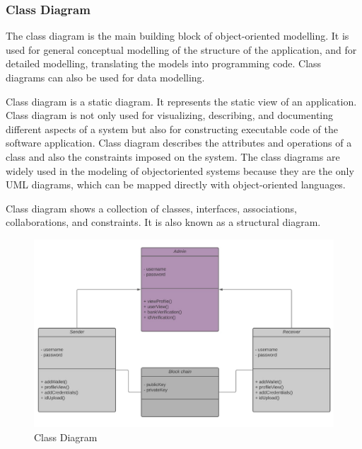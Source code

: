 \documentclass[12pt]{article}
\begin{document}
\newpage

\subsubsection{Class Diagram}

The class diagram is the main building block of object-oriented modelling. It is used for general conceptual modelling of the structure of the application, and for detailed modelling, translating the models into programming code. Class diagrams can also be used for data modelling.
\par Class diagram is a static diagram. It represents the static view of an application. Class diagram is not only used for visualizing, describing, and documenting different aspects of a system but also for constructing executable code of the software application. Class diagram describes the attributes and operations of a class and also the constraints imposed on the system. The class diagrams are widely used in the modeling of objectoriented systems because they are the only UML diagrams, which can be mapped directly with object-oriented languages.
\par Class diagram shows a collection of classes, interfaces, associations, collaborations, and constraints. It is also known as a structural diagram.

\begin{figure}[h!]
\begin{center}
\includegraphics[scale=.9]{CLS}
\caption{Class Diagram}
\end{center}
\end{figure}
\newpage
\end{document}
